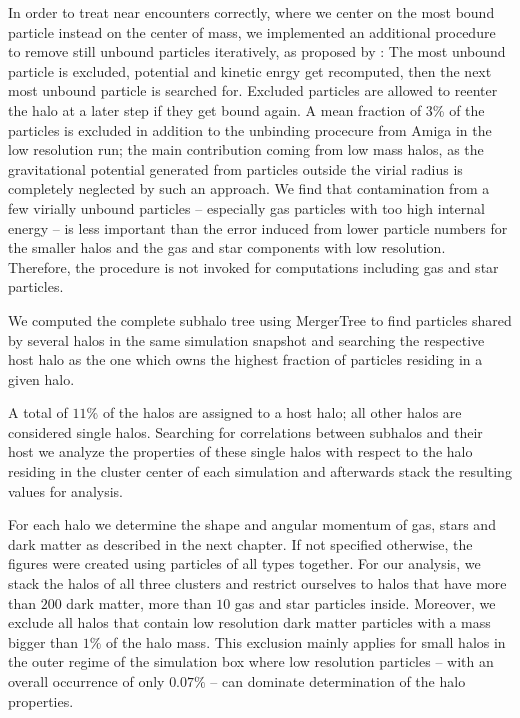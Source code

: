 \documentclass[useAMS,usenatbib]{mn2e}
\begin{document}
In order to treat near encounters correctly, where we center on the most bound
particle instead on the center of mass, we implemented an additional procedure
to remove still unbound particles iteratively, as proposed by
\cite{Porciani2002a}: The most unbound particle is excluded, potential and
kinetic enrgy get recomputed, then the next most unbound particle is searched
for. Excluded particles are allowed to reenter the halo at a later step if
they get bound again. A mean fraction of 3\% of the particles is excluded in
addition to the unbinding procecure from {\sc Amiga} in the low resolution
run; the main contribution coming from low mass halos, as the gravitational
potential generated from particles outside the virial radius is completely
neglected by such an approach. We find that contamination from a few virially
unbound particles -- especially gas particles with too high internal energy --
is less important than the error induced from lower particle numbers for the
smaller halos and the gas and star components with low resolution. Therefore,
the procedure is not invoked for computations including gas and star
particles.

We computed the complete subhalo tree using {\sc MergerTree} to find particles
shared by several halos in the same simulation snapshot and searching the
respective host halo as the one which owns the highest fraction of particles
residing in a given halo.

%
A total of $11\%$ of the halos are assigned to a host halo; all other halos
are considered single halos. Searching for correlations between subhalos and
their host we analyze the properties of these single halos with respect to the
halo residing in the cluster center of each simulation and afterwards stack
the resulting values for analysis.

For each halo we determine the shape and angular momentum of gas, stars and
dark matter as described in the next chapter. If not specified otherwise, the
figures were created using particles of all types together. For our analysis,
we stack the halos of all three clusters and restrict ourselves to halos that
have more than $200$ dark matter, more than $10$ gas and star particles
inside. Moreover, we exclude all halos that contain low resolution dark matter
particles with a mass bigger than $1\%$ of the halo mass. This exclusion
mainly applies for small halos in the outer regime of the simulation box where
low resolution particles -- with an overall occurrence of only $0.07\%$ -- can
dominate determination of the halo properties.
%
%
\end{document}

